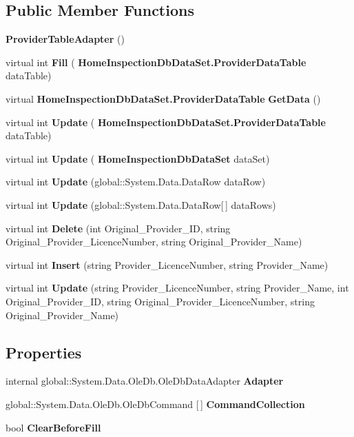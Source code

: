 \subsection*{Public Member Functions}
\begin{DoxyCompactItemize}
\item 
\textbf{ Provider\+Table\+Adapter} ()
\item 
virtual int \textbf{ Fill} (\textbf{ Home\+Inspection\+Db\+Data\+Set.\+Provider\+Data\+Table} data\+Table)
\item 
virtual \textbf{ Home\+Inspection\+Db\+Data\+Set.\+Provider\+Data\+Table} \textbf{ Get\+Data} ()
\item 
virtual int \textbf{ Update} (\textbf{ Home\+Inspection\+Db\+Data\+Set.\+Provider\+Data\+Table} data\+Table)
\item 
virtual int \textbf{ Update} (\textbf{ Home\+Inspection\+Db\+Data\+Set} data\+Set)
\item 
virtual int \textbf{ Update} (global\+::\+System.\+Data.\+Data\+Row data\+Row)
\item 
virtual int \textbf{ Update} (global\+::\+System.\+Data.\+Data\+Row[$\,$] data\+Rows)
\item 
virtual int \textbf{ Delete} (int Original\+\_\+\+Provider\+\_\+\+ID, string Original\+\_\+\+Provider\+\_\+\+Licence\+Number, string Original\+\_\+\+Provider\+\_\+\+Name)
\item 
virtual int \textbf{ Insert} (string Provider\+\_\+\+Licence\+Number, string Provider\+\_\+\+Name)
\item 
virtual int \textbf{ Update} (string Provider\+\_\+\+Licence\+Number, string Provider\+\_\+\+Name, int Original\+\_\+\+Provider\+\_\+\+ID, string Original\+\_\+\+Provider\+\_\+\+Licence\+Number, string Original\+\_\+\+Provider\+\_\+\+Name)
\end{DoxyCompactItemize}
\subsection*{Properties}
\begin{DoxyCompactItemize}
\item 
internal global\+::\+System.\+Data.\+Ole\+Db.\+Ole\+Db\+Data\+Adapter \textbf{ Adapter}\hspace{0.3cm}{\ttfamily  [get]}
\item 
global\+::\+System.\+Data.\+Ole\+Db.\+Ole\+Db\+Command [$\,$] \textbf{ Command\+Collection}\hspace{0.3cm}{\ttfamily  [get]}
\item 
bool \textbf{ Clear\+Before\+Fill}\hspace{0.3cm}{\ttfamily  [get, set]}
\end{DoxyCompactItemize}


